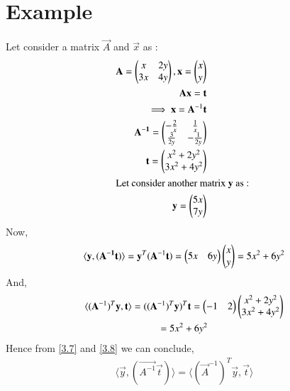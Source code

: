 \documentclass[journal,12pt,twocolumn]{IEEEtran}
\numberwithin{table}{section}
\begin{document}
\section{Example}
Let consider a matrix $\vec{A}$ and $\vec{x}$ as :
\begin{align}
\mathbf{A} = \begin{pmatrix}x & 2y \\ 3x  & 4y\end{pmatrix}, \mathbf{x} = \begin{pmatrix}x \\y\end{pmatrix}\\
\mathbf{A}\mathbf{x} = \mathbf{t}\\
\implies \mathbf{x} = \mathbf{A}^{-1}\mathbf{t}\\
\mathbf{A^{-1}} =\begin{pmatrix}-\frac{2}{x} & \frac{1}{x} \\ \frac{3}{2y} & -\frac{1}{2y}\end{pmatrix}\\
\mathbf{t} = \begin{pmatrix}x^2 + 2y^2 \\ 3x^2 + 4y^2\end{pmatrix}\\
\intertext{Let consider another matrix $\mathbf{y}$ as : }
\mathbf{y} = \begin{pmatrix}5x \\7y\end{pmatrix}
\end{align}
Now,
\begin{multline}
\langle \mathbf{y},(\mathbf{A^{-1}}\mathbf{t}) \rangle =\mathbf{y}^T(\mathbf{A}^{-1}\mathbf{t}) = \begin{pmatrix}5x & 6y\end{pmatrix}\begin{pmatrix}x \\ y\end{pmatrix}  = 5x^2 + 6y^2 \label{3.7}
\end{multline}
And,
\begin{multline}
\langle   (\mathbf{A}^{-1})^T\mathbf{y}, \mathbf{t} \rangle = ((\mathbf{A}^{-1})^T\mathbf{y})^T \mathbf{t} = \begin{pmatrix}-1 & 2\end{pmatrix}\begin{pmatrix}x^2 +2y^2 \\3x^2 +4y^2\end{pmatrix}\\ = 5x^2 + 6y^2 \label{3.8}
\end{multline}
Hence from \eqref{3.7} and \eqref{3.8} we can conclude,
\begin{align}
 \langle \vec{y},(\vec{A^{-1}}\vec{t}) \rangle = \langle (\vec{A}^{-1})^T\vec{y}, \vec{t} \rangle
\end{align}
\end{document}
